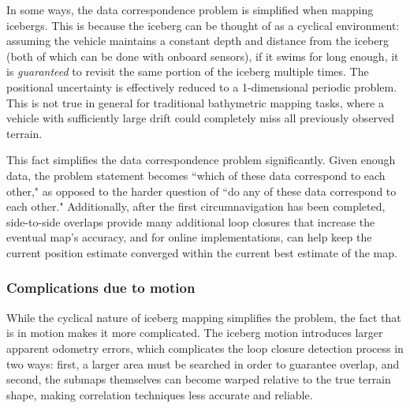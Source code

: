 In some ways, the data correspondence problem is simplified when mapping icebergs. This is because the iceberg can be thought of as a cyclical environment: assuming the vehicle maintains a constant depth and distance from the iceberg (both of which can be done with onboard sensors), if it swims for long enough, it is \emph{guaranteed} to revisit the same portion of the iceberg multiple times. The positional uncertainty is effectively reduced to a 1-dimensional periodic problem. This is not true in general for traditional bathymetric mapping tasks, where a vehicle with sufficiently large drift could completely miss all previously observed terrain. 

This fact simplifies the data correspondence problem significantly. Given enough data, the problem statement becomes ``which of these data correspond to each other," as opposed to the harder question of ``do any of these data correspond to each other." Additionally, after the first circumnavigation has been completed, side-to-side overlaps provide many additional loop closures that increase the eventual map's accuracy, and for online implementations, can help keep the current position estimate converged within the current best estimate of the map.


\subsubsection{Complications due to motion} 

While the cyclical nature of iceberg mapping simplifies the problem, the fact that is in motion makes it more complicated. The iceberg motion introduces larger apparent odometry errors, which complicates the loop closure detection process in two ways: first, a larger area must be searched in order to guarantee overlap, and second, the submaps themselves can become warped relative to the true terrain shape, making correlation techniques less accurate and reliable.


